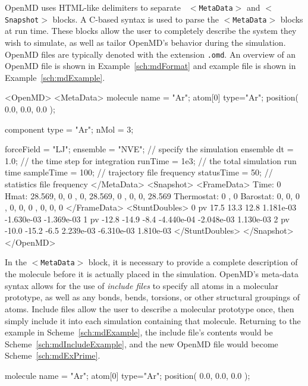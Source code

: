 \documentclass[]{book}
\begin{document}
{\sc OpenMD} uses HTML-like delimiters to separate {\tt
  $<$MetaData$>$} and {\tt $<$Snapshot$>$} blocks.  A C-based syntax
is used to parse the {\tt $<$MetaData$>$} blocks at run time.  These
blocks allow the user to completely describe the system they wish to
simulate, as well as tailor {\sc OpenMD}'s behavior during the
simulation.  {\sc OpenMD} files are typically denoted with the
extension {\tt .omd}. An overview of an {\sc OpenMD} file is shown in
Example~\ref{sch:mdFormat} and example file is shown in
Example~\ref{sch:mdExample}.

\begin{code}[caption={[An example of a complete OpenMD
file] An example showing a complete OpenMD file.},
label={sch:mdExample}] 
<OpenMD>
  <MetaData>
molecule{
  name = "Ar";
  atom[0]{
    type="Ar";
    position( 0.0, 0.0, 0.0 );
  }
}

component{
  type = "Ar";
  nMol = 3;
}

forceField = "LJ";
ensemble = "NVE"; // specify the simulation ensemble
dt = 1.0;         // the time step for integration
runTime = 1e3;    // the total simulation run time
sampleTime = 100; // trajectory file frequency
statusTime = 50;  // statistics file frequency
  </MetaData>
  <Snapshot>
    <FrameData>
        Time: 0
        Hmat: {{ 28.569, 0, 0 }, { 0, 28.569, 0 }, { 0, 0, 28.569 }}
  Thermostat: 0 , 0
    Barostat: {{ 0, 0, 0 }, { 0, 0, 0 }, { 0, 0, 0 }}
    </FrameData>
    <StuntDoubles>
         0      pv   17.5  13.3 12.8  1.181e-03 -1.630e-03 -1.369e-03
         1      pv  -12.8 -14.9 -8.4 -4.440e-04 -2.048e-03  1.130e-03
         2      pv  -10.0 -15.2 -6.5  2.239e-03 -6.310e-03  1.810e-03
    </StuntDoubles>
  </Snapshot>
</OpenMD>
\end{code}

In the {\tt $<$MetaData$>$} block, it is necessary to provide a
complete description of the molecule before it is actually placed in
the simulation. {\sc OpenMD}'s meta-data syntax allows for the use of
{\it include files} to specify all atoms in a molecular prototype, as
well as any bonds, bends, torsions, or other structural groupings of
atoms.  Include files allow the user to describe a molecular prototype
once, then simply include it into each simulation containing that
molecule. Returning to the example in Scheme~\ref{sch:mdExample}, the
include file's contents would be Scheme~\ref{sch:mdIncludeExample},
and the new {\sc OpenMD} file would become Scheme~\ref{sch:mdExPrime}.

\begin{code}[caption={An example molecule definition in an
include file.},label={sch:mdIncludeExample}]
molecule{
  name = "Ar";
  atom[0]{
    type="Ar";
    position( 0.0, 0.0, 0.0 );
  }
}
\end{code}
\end{document}
